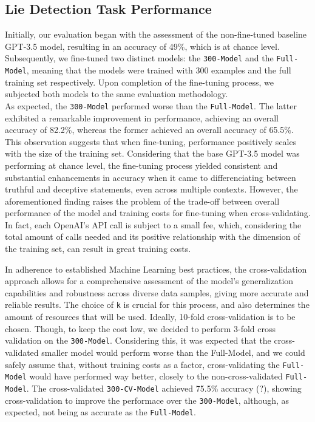 \documentclass[10pt,twocolumn,letterpaper]{article}
\begin{document}
\subsection{Lie Detection Task Performance}

Initially, our evaluation began with the assessment of the non-fine-tuned
baseline GPT-3.5 model, resulting in an accuracy of 49\%, which is at chance level. Subsequently,
we fine-tuned two distinct models: the \texttt{300-Model} and the \texttt{Full-Model}, meaning
that the models were trained with 300 examples and the full training set respectively.
Upon completion of the fine-tuning process, we subjected both models to the same evaluation methodology. \\

As expected, the \texttt{300-Model} performed worse than the \texttt{Full-Model}. The latter exhibited a 
remarkable improvement in performance, achieving an overall accuracy of 82.2\%, whereas the former achieved an overall accuracy of 65.5\%.
This observation suggests that when fine-tuning, performance positively scales with the size
of the training set. Considering that the base GPT-3.5 model was performing at chance level, the fine-tuning process
yielded consistent and substantial enhancements in accuracy when it came to differenciating
between truthful and deceptive statements, even across multiple contexts. 
However, the aforementioned finding raises the problem of the trade-off between overall performance of the model
and training costs for fine-tuning when cross-validating. In fact, each OpenAI's API call is subject to a small fee, which, considering 
the total amount of calls needed and its positive relationship with the dimension of the training set, can result in great training costs.

In adherence to established Machine Learning best practices, the cross-validation approach allows for a comprehensive assessment 
of the model's generalization capabilities and robustness across diverse data samples, giving more accurate and reliable results. The choice of \texttt{k} 
is crucial for this process, and also determines the amount of resources that will be used. Ideally, 10-fold cross-validation is to be chosen.
Though, to keep the cost low, we decided to perform 3-fold cross validation on the \texttt{300-Model}. Considering this, it was expected that the cross-validated
smaller model would perform worse than the Full-Model, and we could safely assume that, without training costs as a factor, cross-validating the \texttt{Full-Model}
would have performed way better, closely to the non-cross-validated \texttt{Full-Model}.
The cross-validated \texttt{300-CV-Model} achieved 75.5\% accuracy (?), showing cross-validation to improve the performace over the \texttt{300-Model},
although, as expected, not being as accurate as the \texttt{Full-Model}.
\end{document}
